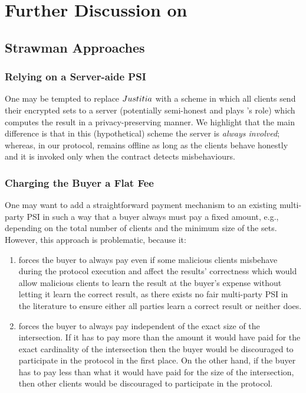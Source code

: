 

\section{Further Discussion on  \withFai}\label{sec::Discussion-justitia}


\subsection{Strawman Approaches}


\subsubsection{Relying on a Server-aide PSI} One may be tempted to replace ${Justitia}$ with a scheme in which all clients send their encrypted sets to a server (potentially semi-honest and plays \aud's role) which computes the result in a privacy-preserving manner.  We highlight that the main difference is that in this (hypothetical) scheme the server is \emph{always involved};  whereas, in our protocol, \aud remains offline as long as the clients behave honestly and it is invoked only when the contract detects misbehaviours.  


\subsubsection{Charging the Buyer a Flat Fee}
One may want to add a straightforward payment mechanism to an existing multi-party PSI in such a way that a buyer always must pay a fixed amount, e.g., depending on the total number of clients and the minimum size of the sets. However, this approach is problematic, because it:

\begin{enumerate}
\item forces the buyer to always pay even if some malicious clients misbehave during the protocol execution and affect the results' correctness which would allow malicious clients to learn the result at the buyer's expense without letting it learn the correct result, as there exists no fair multi-party PSI in the literature to ensure either all parties learn a correct result or neither does. 

\item forces the buyer to always pay independent of the exact size of the intersection. If it has to pay more than the amount it would have paid for the exact cardinality of the intersection then the buyer would be discouraged to participate in the protocol in the first place. On the other hand, if the buyer has to pay less than what it would have paid for the size of the intersection, then other clients would be discouraged to participate in the protocol. 

\end{enumerate}






 
